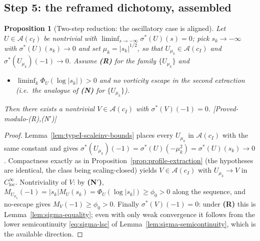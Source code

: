 \documentclass[11pt]{article}
\newtheorem{proposition}[theorem]{Proposition}
\theoremstyle{definition}
\theoremstyle{remark}
\begin{document}
\subsection{Step 5: the reframed dichotomy, assembled}
\label{subsec:s39-step5}

\begin{proposition}[Two-step reduction: the oscillatory case is aligned]
  \label{prop:two-step-reduction}
  Let $U\in\mathcal{A}(c_I)$ be nontrivial with
  $\liminf_{s\to-\infty}\sigma^*(U)(s)=0$; pick $s_k\to-\infty$ with
  $\sigma^*(U)(s_k)\to0$ and set $\mu_k=|s_k|^{1/2}$, so that
  $U_{\mu_k}\in\mathcal{A}(c_I)$ and $\sigma^*(U_{\mu_k})(-1)\to0$. Assume
  \textbf{(R)} for the family $\{U_{\mu_k}\}$ and
  \begin{itemize}
  \item[\textbf{(N$'$)}] $\liminf_k\Phi_U(\log|s_k|)>0$ and no vorticity
    escape in the second extraction (i.e.\ the analogue of \textbf{(N)} for
    $\{U_{\mu_k}\}$).
  \end{itemize}
  Then there exists a nontrivial $V\in\mathcal{A}(c_I)$ with
  $\sigma^*(V)(-1)=0$.
  \emph{[Proved-modulo-(R),(N$'$)]}
\end{proposition}
\begin{proof}
  Lemma~\ref{lem:typeI-scaleinv-bounds} places every $U_{\mu_k}$ in
  $\mathcal{A}(c_I)$ with the same constant and gives
  $\sigma^*(U_{\mu_k})(-1)=\sigma^*(U)(-\mu_k^2)=\sigma^*(U)(s_k)\to0$.
  Compactness exactly as in Proposition~\ref{prop:profile-extraction} (the
  hypotheses are identical, the class being scaling-closed) yields
  $V\in\mathcal{A}(c_I)$ with $U_{\mu_k}\to V$ in
  $C^\infty_{\mathrm{loc}}$. Nontriviality of $V$: by \textbf{(N$'$)},
  $M_{U_{\mu_k}}(-1)=|s_k|M_U(s_k)=\Phi_U(\log|s_k|)\geq\phi_0>0$ along the
  sequence, and no-escape gives $M_V(-1)\geq\phi_0>0$. Finally
  $\sigma^*(V)(-1)=0$: under \textbf{(R)} this is
  Lemma~\ref{lem:sigma-equality}; even with only weak convergence it follows
  from the lower semicontinuity \eqref{eq:sigma-lsc} of
  Lemma~\ref{lem:sigma-semicontinuity}, which is the available direction.
\end{proof}
\end{document}
